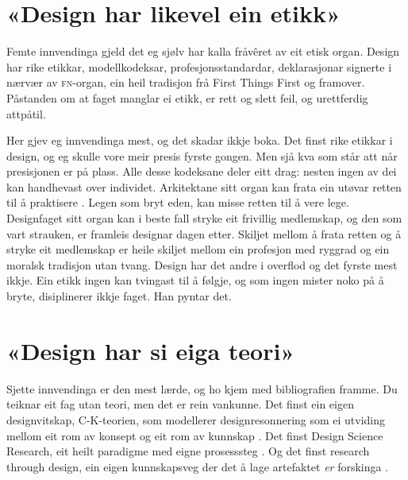 \section{«Design har likevel ein etikk»}

Femte innvendinga gjeld det eg sjølv har kalla fråvêret av eit etisk organ. Design har rike etikkar, modellkodeksar, profesjonsstandardar, deklarasjonar signerte i nærvær av \textsc{fn}-organ, ein heil tradisjon frå First Things First og framover. Påstanden om at faget manglar ei etikk, er rett og slett feil, og urettferdig attpåtil.

Her gjev eg innvendinga mest, og det skadar ikkje boka. Det finst rike etikkar i design, og eg skulle vore meir presis fyrste gongen. Men sjå kva som står att når presisjonen er på plass. Alle desse kodeksane deler eitt drag: nesten ingen av dei kan handhevast over individet. Arkitektane sitt organ kan frata ein utøvar retten til å praktisere \autocite{riba2019code}. Legen som bryt eden, kan misse retten til å vere lege. Designfaget sitt organ kan i beste fall stryke eit frivillig medlemskap, og den som vart strauken, er framleis designar dagen etter. Skiljet mellom å frata retten og å stryke eit medlemskap er heile skiljet mellom ein profesjon med ryggrad og ein moralsk tradisjon utan tvang. Design har det andre i overflod og det fyrste mest ikkje. Ein etikk ingen kan tvingast til å følgje, og som ingen mister noko på å bryte, disiplinerer ikkje faget. Han pyntar det.

\section{«Design har si eiga teori»}

Sjette innvendinga er den mest lærde, og ho kjem med bibliografien framme. Du teiknar eit fag utan teori, men det er rein vankunne. Det finst ein eigen designvitskap, C-K-teorien, som modellerer designresonnering som ei utviding mellom eit rom av konsept og eit rom av kunnskap \autocite{hatchuel2009}. Det finst Design Science Research, eit heilt paradigme med eigne prosesssteg \autocite{hevner2004dsr, peffers2007dsrm}. Og det finst research through design, ein eigen kunnskapsveg der det å lage artefaktet \emph{er} forskinga \autocite{frayling1993, zimmerman2007rtd}.

